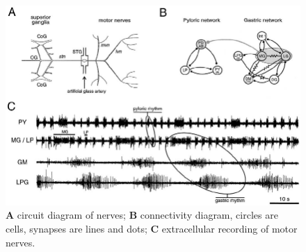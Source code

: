 \documentclass{beamer}
\begin{document}
\begin{frame}
\begin{columns}
    \begin{figure}
      \includegraphics[width=\textwidth]{gfx/STG-rhythms.png}
      \centering
      \caption{\textbf{A} circuit diagram of nerves; \textbf{B} connectivity diagram, circles are cells, synapses are lines and dots; \textbf{C} extracellular recording of motor nerves.}
      \label{fig:extracellular}
    \end{figure}

  \end{columns}

\end{frame}

\end{document}
